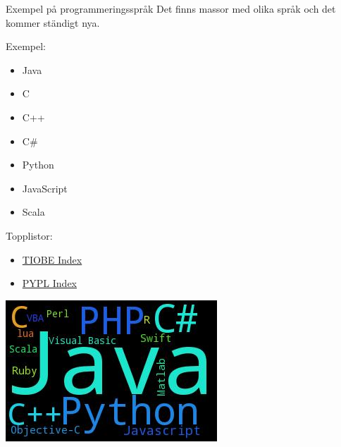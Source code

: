 \begin{Slide}{Exempel på programmeringsspråk}
Det finns massor med olika språk och det kommer ständigt nya.
\vspace{1em}
\begin{multicols}{2}
Exempel:
\begin{itemize}
\item Java
\item C
\item C++
\item C\#
\item Python
\item JavaScript
\item Scala
\end{itemize}

\columnbreak %

Topplistor:
\begin{itemize}
\item \href{http://www.tiobe.com/index.php/content/paperinfo/tpci/index.html}{TIOBE Index}
\item \href{http://pypl.github.io/PYPL.html}{PYPL Index}
\end{itemize}
\vspace{1em}
\includegraphics[width=0.8\columnwidth]{../img/pypl}
\end{multicols}

\end{Slide}


